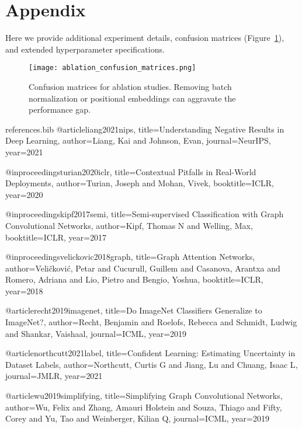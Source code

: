 \documentclass[11pt]{article}
\begin{document}
\clearpage
\appendix
\section*{Appendix}
Here we provide additional experiment details, confusion matrices (Figure~\ref{fig:ablation}), and extended hyperparameter specifications.

\begin{figure}[h]
    \centering
    \texttt{[image: ablation\_confusion\_matrices.png]}
    \caption{Confusion matrices for ablation studies. Removing batch normalization or positional embeddings can aggravate the performance gap.}
    \label{fig:ablation}
\end{figure}

\begin{filecontents}{references.bib}
@article{liang2021nips,
  title={Understanding Negative Results in Deep Learning},
  author={Liang, Kai and Johnson, Evan},
  journal={NeurIPS},
  year={2021}
}

@inproceedings{turian2020iclr,
  title={Contextual Pitfalls in Real-World Deployments},
  author={Turian, Joseph and Mohan, Vivek},
  booktitle={ICLR},
  year={2020}
}

@inproceedings{kipf2017semi,
  title={Semi-supervised Classification with Graph Convolutional Networks},
  author={Kipf, Thomas N and Welling, Max},
  booktitle={ICLR},
  year={2017}
}

@inproceedings{velickovic2018graph,
  title={Graph Attention Networks},
  author={Veli{\v{c}}kovi{\'c}, Petar and Cucurull, Guillem and Casanova, Arantxa and Romero, Adriana and Lio, Pietro and Bengio, Yoshua},
  booktitle={ICLR},
  year={2018}
}

@article{recht2019imagenet,
  title={Do ImageNet Classifiers Generalize to ImageNet?},
  author={Recht, Benjamin and Roelofs, Rebecca and Schmidt, Ludwig and Shankar, Vaishaal},
  journal={ICML},
  year={2019}
}

@article{northcutt2021label,
  title={Confident Learning: Estimating Uncertainty in Dataset Labels},
  author={Northcutt, Curtis G and Jiang, Lu and Chuang, Isaac L},
  journal={JMLR},
  year={2021}
}

@article{wu2019simplifying,
  title={Simplifying Graph Convolutional Networks},
  author={Wu, Felix and Zhang, Amauri Holstein and Souza, Thiago and Fifty, Corey and Yu, Tao and Weinberger, Kilian Q},
  journal={ICML},
  year={2019}
}
\end{filecontents}
\end{document}
